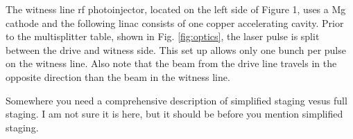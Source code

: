 \documentclass{iitthesis}
\newcommand{\lsnote}[1]{\textsf{{\color{violet}{ LS note:}   #1 }}}
\begin{document}
The witness line rf photoinjector, located on the left side of Figure
1, uses a Mg cathode and the following linac consists of one copper
accelerating cavity. Prior to the multisplitter table, shown in
Fig. \ref{fig:optics}, the laser pulse is split between the drive and witness side.
This set up allows only one bunch per pulse on the witness line. Also
note that the beam from the drive line travels in the opposite direction
than the beam in the witness line. 



\lsnote{Somewhere you need a comprehensive description of simplified staging vesus full staging.  I am not sure it is here, but it should be before you mention simplified staging.}
\end{document}
